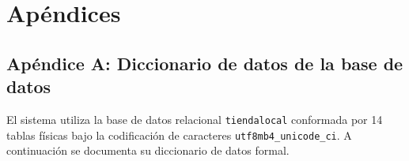 \documentclass[11pt,a4paper]{report}
\begin{document}
\newpage

\chapter{Apéndices}

\section{Apéndice A: Diccionario de datos de la base de datos}

El sistema utiliza la base de datos relacional \texttt{tiendalocal} conformada por 14 tablas físicas bajo la codificación de caracteres \texttt{utf8mb4\_unicode\_ci}. A continuación se documenta su diccionario de datos formal.
\end{document}
